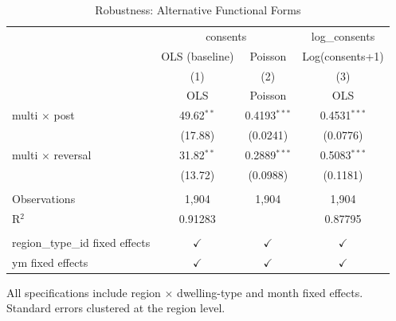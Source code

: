 
\begin{table}[htbp]
   \caption{\label{tab:robustness} Robustness: Alternative Functional Forms}
   \bigskip
   \centering
   \begin{tabular}{lccc}
      \toprule
       & \multicolumn{2}{c}{consents} & log\_consents\\
                                       & OLS (baseline) & Poisson        & Log(consents+1) \\   
                                       & (1)            & (2)            & (3)\\  
                                       &  OLS           & Poisson        & OLS\\  
      \midrule 
      multi $\times$ post              & 49.62$^{**}$   & 0.4193$^{***}$ & 0.4531$^{***}$\\   
                                       & (17.88)        & (0.0241)       & (0.0776)\\   
      multi $\times$ reversal          & 31.82$^{**}$   & 0.2889$^{***}$ & 0.5083$^{***}$\\   
                                       & (13.72)        & (0.0988)       & (0.1181)\\   
       \\
      Observations                     & 1,904          & 1,904          & 1,904\\  
      R$^2$                            & 0.91283        &                & 0.87795\\  
       \\
      region\_type\_id fixed effects   & $\checkmark$   & $\checkmark$   & $\checkmark$\\   
      ym fixed effects                 & $\checkmark$   & $\checkmark$   & $\checkmark$\\   
      \bottomrule
   \end{tabular}
   
   \par \raggedright \footnotesize 
   All specifications include region $\times$ dwelling-type and month fixed effects. Standard errors clustered at the region level.
\end{table}


